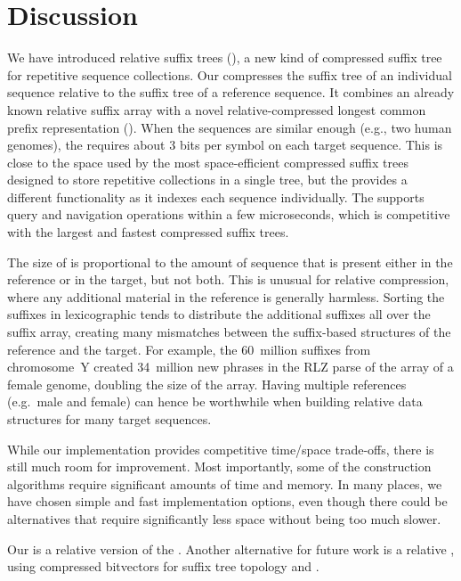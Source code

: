 

\section{Discussion}\label{section:discussion}

We have introduced relative suffix trees (\RCST), a new kind of compressed suffix tree for repetitive sequence collections. Our \RCST{} compresses the suffix tree of an individual sequence relative to the suffix tree of a reference sequence. It combines an already known relative suffix array with a novel relative-compressed longest common prefix representation (\RLCP). When the sequences are similar enough (e.g., two human genomes), the \RCST{} requires about 3 bits per symbol on each target sequence. This is close to the space used by the most space-efficient compressed suffix trees designed to store repetitive collections in a single tree, but the \RCST{} provides a different functionality as it indexes each sequence individually. The \RCST{} supports query and navigation operations within a few microseconds, which is competitive with the largest and fastest compressed suffix trees.

The size of \RCST{} is proportional to the amount of sequence that is present either in the reference or in the target, but not both. This is unusual for relative compression, where any additional material in the reference is generally harmless. Sorting the suffixes in lexicographic tends to distribute the additional suffixes all over the suffix array, creating many mismatches between the suffix-based structures of the reference and the target. For example, the 60~million suffixes from chromosome~Y created 34~million new phrases in the RLZ parse of the \DLCP{} array of a female genome, doubling the size of the \RLCP{} array. Having multiple references (e.g.~male and female) can hence be worthwhile when building relative data structures for many target sequences.

While our \RCST{} implementation provides competitive time/space trade-offs, there is still much room for improvement. Most importantly, some of the construction algorithms require significant amounts of time and memory. In many places, we have chosen simple and fast implementation options, even though there could be alternatives that require significantly less space without being too much slower.

Our \RCST{} is a relative version of the \CSTnpr. Another alternative for future work is a relative \CSTsada, using \RLZ{} compressed bitvectors for suffix tree topology and \PLCP. %

